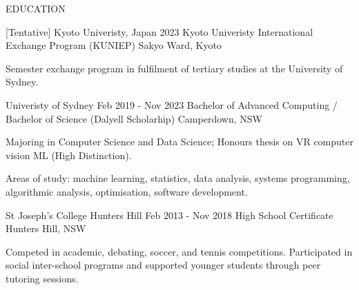 
\begin{ResumeSection}{EDUCATION}

    \begin{DatedField}
        {[Tentative] Kyoto Univeristy, Japan}
        {2023}
        {Kyoto Univeristy International Exchange Program (KUNIEP)}
        {Sakyo Ward, Kyoto}
        \item Semester exchange program in fulfilment of tertiary studies at the University of Sydney.
    \end{DatedField}

    \begin{DatedField}
        {Univeristy of Sydney}
        {Feb 2019 - Nov 2023}
        {Bachelor of Advanced Computing / Bachelor of Science (Dalyell Scholarhip)}
        {Camperdown, NSW}
        \item Majoring in Computer Science and Data Science; Honours thesis on VR computer vision ML (High Distinction).
        \item Areas of study: machine learning, statistics, data analysis, systems programming, algorithmic analysis, optimisation, software development.
    \end{DatedField}

    \begin{DatedField}
        {St Joseph's College Hunters Hill}
        {Feb 2013 - Nov 2018}
        {High School Certificate}
        {Hunters Hill, NSW}
        \item Competed in academic, debating, soccer, and tennis competitions. Participated in social inter-school programs and supported younger students through peer tutoring sessions.
    \end{DatedField}
    
\end{ResumeSection}